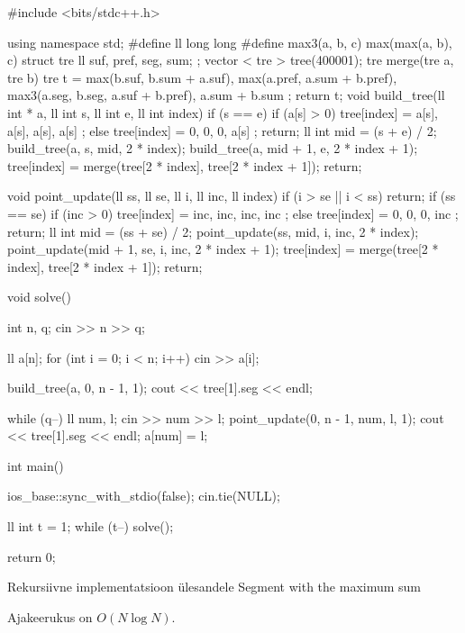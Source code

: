 \documentclass{trkut}
\begin{document}
\begin{cclol}
#include <bits/stdc++.h>

using namespace std;
#define ll long long
#define max3(a, b, c) max(max(a, b), c)
struct tre {
  ll suf, pref, seg, sum;
};
vector < tre > tree(400001);
tre merge(tre a, tre b) {
  tre t = {
    max(b.suf, b.sum + a.suf),
    max(a.pref, a.sum + b.pref),
    max3(a.seg, b.seg, a.suf + b.pref),
    a.sum + b.sum
  };
  return t;
}
void build_tree(ll int * a, ll int s, ll int e, ll int index) {
  if (s == e) {
    if (a[s] > 0)
      tree[index] = {
        a[s],
        a[s],
        a[s],
        a[s]
      };
    else
      tree[index] = {
        0,
        0,
        0,
        a[s]
      };
    return;
  }
  ll int mid = (s + e) / 2;
  build_tree(a, s, mid, 2 * index);
  build_tree(a, mid + 1, e, 2 * index + 1);
  tree[index] = merge(tree[2 * index], tree[2 * index + 1]);
  return;
}

void point_update(ll ss, ll  se, ll i, ll inc, ll index) {
  if (i > se || i < ss)
    return;
  if (ss == se) {
    if (inc > 0)
      tree[index] = {
        inc,
        inc,
        inc,
        inc
      };
    else
      tree[index] = {
        0,
        0,
        0,
        inc
      };
    return;
  }
  ll int mid = (ss + se) / 2;
  point_update(ss, mid, i, inc, 2 * index);
  point_update(mid + 1, se, i, inc, 2 * index + 1);
  tree[index] = merge(tree[2 * index], tree[2 * index + 1]);
  return;
}

void solve() {
  int n, q;
  cin >> n >> q;

  ll a[n];
  for (int i = 0; i < n; i++)
    cin >> a[i];

  build_tree(a, 0, n - 1, 1);
  cout << tree[1].seg << endl;

  while (q--) {
    ll num, l;
    cin >> num >> l;
    point_update(0, n - 1, num, l, 1);
    cout << tree[1].seg << endl;
    a[num] = l;
  }

}
int main() {
  ios_base::sync_with_stdio(false);
  cin.tie(NULL);

  ll int t = 1;
  while (t--) {
    solve();
  }

  return 0;
}
\end{cclol}
 \begin{kk}[H]%
    \caption{Rekursiivne implementatsioon ülesandele Segment with the maximum sum}%
    \label{EMaxx}%
    \end{kk}
Ajakeerukus on $O(N\log N)$.
\end{document}
